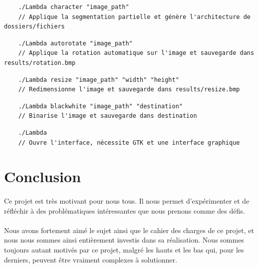 \documentclass{article}
\begin{document}
\begin{lstlisting}
	./Lambda character "image_path"
	// Applique la segmentation partielle et génère l'architecture de dossiers/fichiers
\end{lstlisting}

\begin{lstlisting}
	./Lambda autorotate "image_path"
	// Applique la rotation automatique sur l'image et sauvegarde dans results/rotation.bmp
\end{lstlisting}

\begin{lstlisting}
	./Lambda resize "image_path" "width" "height"
	// Redimensionne l'image et sauvegarde dans results/resize.bmp
\end{lstlisting}

\begin{lstlisting}
	./Lambda blackwhite "image_path" "destination"
	// Binarise l'image et sauvegarde dans destination
\end{lstlisting}

\begin{lstlisting}
	./Lambda
	// Ouvre l'interface, nécessite GTK et une interface graphique
\end{lstlisting}


\newpage
{}
\section{Conclusion}

\paragraph{}Ce projet est très motivant pour nous tous. Il nous permet d'expérimenter et de réfléchir à des problématiques intéressantes que nous prenons comme des défis. 

\paragraph{}Nous avons fortement aimé le sujet ainsi que le cahier des charges de ce projet, et nous nous sommes ainsi entièrement investis dans sa réalisation. Nous sommes toujours autant motivés par ce projet, malgré les hauts et les bas qui, pour les derniers, peuvent être vraiment complexes à solutionner.\\
\end{document}
